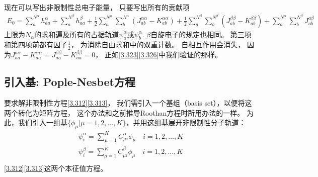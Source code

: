现在可以写出非限制性总电子能量，
只要写出所有的贡献项
\begin{align}
	E_{0}=\sum_{a}^{N^{\alpha}} h_{a a}^{\alpha}+\sum_{a}^{N^{\beta}} h_{a a}^{\beta}+\frac{1}{2} \sum_{a}^{N^{\alpha}} \sum_{b}^{N^{\alpha}}\left(J_{a b}^{\alpha \alpha}-K_{a b}^{\alpha \alpha}\right)+\frac{1}{2} \sum_{a}^{N^{\beta}} \sum_{b}^{N^{\beta}}\left(J_{a b}^{\beta \beta}-K_{a b}^{\beta \beta}\right)+\sum_{a}^{N^{\alpha}} \sum_{b}^{N^{\beta}} J_{a b}^{a \beta}
\end{align}
上限为$N_\alpha$的求和遍及所有的占据轨道$\psi_a^\alpha$或$\psi_b^\alpha$. 
$\beta$自旋电子的规定也相同。 
第三项和第四项前都有因子$\frac{1}{2}$，
为消除自由求和中的双重计数。
自相互作用会消失，
因为$J_{a a}^{a \alpha}-K_{a a}^{\alpha \alpha}=J_{a a}^{\beta \beta}-K_{a a}^{\beta \beta}=0$，
正如\eqref{3.323}\eqref{3.326}中我们验证的那样。

\subsection{引入基: Pople-Nesbet方程}
要求解非限制性\hft 方程\eqref{3.312}\eqref{3.313}，
我们需引入一个基组（basis set），以便将这两个转化为矩阵方程，
这个办法和之前推导Roothan方程时所用办法的一样。
为此，我们引入一组基$\{\phi_\mu|\mu = 1,2,\ldots,K\}$，并用这组基展开非限制性分子轨道：
\begin{align}
	\psi_i^\alpha = \sum_{\mu=1}^K C_{\mu i}^\alpha \phi_\mu \quad i =1,2,\ldots,K \\
	\psi_i^\beta = \sum_{\mu=1}^K C_{\mu i}^\beta \phi_\mu \quad i =1,2,\ldots,K\\
\end{align}
\eqref{3.312}\eqref{3.313}这两个本征值方程。
